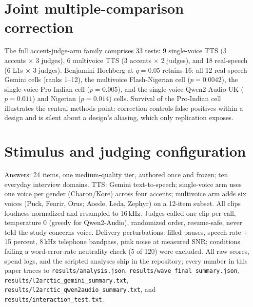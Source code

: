 \section{Joint multiple-comparison correction}
\label{app:bh}
The full accent-judge-arm family comprises 33 tests: 9 single-voice TTS
(3 accents $\times$ 3 judges), 6 multivoice TTS (3 accents $\times$ 2
judges), and 18 real-speech (6 L1s $\times$ 3 judges). Benjamini-Hochberg at
$q=0.05$ retains 16: all 12 real-speech Gemini cells (ranks 1--12), the
multivoice Flash-Nigerian cell ($p=0.0042$), the single-voice Pro-Indian
cell ($p=0.005$), and the single-voice Qwen2-Audio UK ($p=0.011$) and
Nigerian ($p=0.014$) cells. Survival of the Pro-Indian cell illustrates the
central methods point: correction controls false positives within a design
and is silent about a design's aliasing, which only replication exposes.

\section{Stimulus and judging configuration}
\label{app:config}
Answers: 24 items, one medium-quality tier, authored once and frozen; ten
everyday interview domains. TTS: Gemini text-to-speech; single-voice arm
uses one voice per gender (Charon/Kore) across four accents; multivoice arm
adds six voices (Puck, Fenrir, Orus; Aoede, Leda, Zephyr) on a 12-item
subset. All clips loudness-normalized and resampled to 16\,kHz. Judges
called one clip per call, temperature 0 (greedy for Qwen2-Audio), randomized
order, resume-safe, never told the study concerns voice. Delivery
perturbations: filled pauses, speech rate $\pm$15 percent, 8\,kHz telephone
bandpass, pink noise at measured SNR; conditions failing a word-error-rate
neutrality check (5 of 120) were excluded. All raw scores, spend logs, and
the scripted analyses ship in the repository; every number in this paper
traces to \texttt{results/analysis.json},
\texttt{results/wave\_final\_summary.json},
\texttt{results/l2arctic\_gemini\_summary.txt},
\texttt{results/l2arctic\_qwen2audio\_summary.txt}, and
\texttt{results/interaction\_test.txt}.
